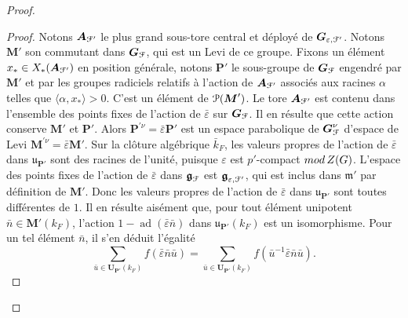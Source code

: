 \documentclass[11pt]{article}
\numberwithin{equation}{section}\providecommand{\og}{«\,}\providecommand{\fg}{\,»}
\let\mathcal \EuScript
\let\epsilon\varepsilon
\let\<\langle
\let\>\rangle
\newcommand{\rmod}{\textup{mod}\,}
\newcommand{\frg}{\mathfrak{g}}
\newcommand{\mfrm}{\mathfrak{m}}
\newcommand{\fru}{\mathfrak{u}}
\DeclareMathOperator{\ad}{ad}
\newcommand{\bA}{\boldsymbol{A}}
\newcommand{\bG}{\boldsymbol{G}}
\newcommand{\bM}{\boldsymbol{M}}
\newcommand{\bP}{\boldsymbol{P}}
\newcommand{\bU}{\boldsymbol{U}}
\newcommand{\cF}{\mathcal{F}}
\newcommand{\cP}{\mathcal{P}}
\theoremstyle{plain}
\theoremstyle{definition}
\begin{document}
\begin{proof}
\begin{proof}
Notons $\bA_{\cF'}$ le plus grand sous-tore central et déployé de $\bG_{\epsilon,\cF'}$. Notons $\bM'$ son commutant dans $\bG_{\cF}$, qui est un Levi de ce groupe. Fixons un élément $x_{*}\in X_{*}(\bA_{\cF'})$ en position générale, notons $\bP'$ le sous-groupe de $\bG_{\cF}$ engendré par $\bM'$ et par les groupes radiciels relatifs à l'action de $\bA_{\cF'}$ associés aux racines $\alpha$ telles que $\<\alpha,x_{*}\>>0$. C'est un élément de $\cP(\bM')$.
Le tore $\bA_{\cF'}$ est contenu dans l'ensemble des points fixes de l'action de $\bar{\epsilon}$ sur $\bG_{\cF}$. Il en résulte que cette action conserve $\bM'$ et $\bP'$. Alors $\bP^{\prime\nu}=\bar{\epsilon}\bP'$ est un espace parabolique de $\bG^{\nu}_{\cF}$ d'espace de Levi $\bM^{\prime\nu}=\bar{\epsilon}\bM'$. Sur la clôture algébrique $\bar{k}_{F}$, les valeurs propres de l'action de $\bar{\epsilon}$ dans $\boldsymbol{\fru}_{\bP'}$ sont des racines de l'unité, puisque $\epsilon$ est $p'$-compact $\rmod Z(G)$. L'espace des points fixes de l'action de $\bar{\epsilon}$ dans $\boldsymbol{\frg}_{\cF}$ est $\boldsymbol{\frg}_{\epsilon,\cF'}$, qui est inclus dans $\boldsymbol{\mfrm}'$ par définition de $\bM'$. Donc les valeurs propres de l'action de $\bar{\epsilon}$ dans $\boldsymbol{\fru}_{\bP'}$ sont toutes différentes de $1$. Il en résulte aisément que, pour tout élément unipotent $\bar{n}\in \bM'(k_{F})$, l'action $1-\ad(\bar{\epsilon}\bar{n})$ dans $\boldsymbol{\fru}_{\bP'}(k_{F})$ est un isomorphisme. Pour un tel élément $\bar{n}$, il s'en déduit l'égalité\vspace*{-3pt}\enlargethispage{.2\baselineskip}%
\[
\sum_{\bar{u}\in \bU_{\bP'}(k_{F})}f(\bar{\epsilon}\bar{n}\bar{u})=\sum_{\bar{u}\in \bU_{\bP'}(k_{F})}f(\bar{u}^{-1}\bar{\epsilon}\bar{n}\bar{u}).
\]

\end{proof}
\end{proof}
\end{document}
